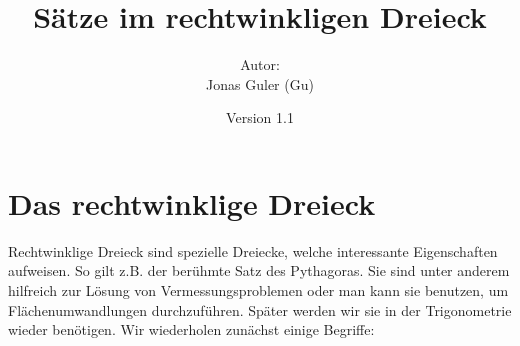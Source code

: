 \documentclass[11pt,oneside]{article}
\newcommand{\Skriptname}{Sätze im rechtwinkligen Dreieck}
\newcommand{\Autor}{Jonas Guler (Gu)}
\begin{document}
\begin{titlepage}
	\clearpage
	\title{\Huge\textbf{\Skriptname} \\[1cm]}
	\author{Autor:\\ \Autor}
	\date{\normalsize {Version 1.1}\\ \datelong}
	\maketitle
	\thispagestyle{empty}
	\vfill
	\tableofcontents
\end{titlepage}
\section{Das rechtwinklige Dreieck}
	Rechtwinklige Dreieck sind spezielle Dreiecke, welche interessante Eigenschaften aufweisen. So gilt z.B. der berühmte Satz des Pythagoras. Sie sind unter anderem hilfreich zur Lösung von Vermessungsproblemen oder man kann sie benutzen, um Flächenumwandlungen durchzuführen. Später werden wir sie in der Trigonometrie wieder benötigen. Wir wiederholen zunächst einige Begriffe:
\end{document}
